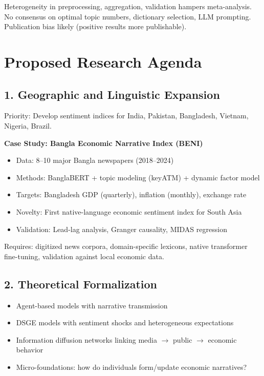 \documentclass[11pt]{article}
\begin{document}
Heterogeneity in preprocessing, aggregation, validation hampers meta-analysis. No consensus on optimal topic numbers, dictionary selection, LLM prompting. Publication bias likely (positive results more publishable).

\section{Proposed Research Agenda}

\subsection{1. Geographic and Linguistic Expansion}

Priority: Develop sentiment indices for India, Pakistan, Bangladesh, Vietnam, Nigeria, Brazil.

\textbf{Case Study: Bangla Economic Narrative Index (BENI)}
\begin{itemize}
\item Data: 8--10 major Bangla newspapers (2018--2024)
\item Methods: BanglaBERT + topic modeling (keyATM) + dynamic factor model
\item Targets: Bangladesh GDP (quarterly), inflation (monthly), exchange rate
\item Novelty: First native-language economic sentiment index for South Asia
\item Validation: Lead-lag analysis, Granger causality, MIDAS regression
\end{itemize}

Requires: digitized news corpora, domain-specific lexicons, native transformer fine-tuning, validation against local economic data.

\subsection{2. Theoretical Formalization}

\begin{itemize}
\item Agent-based models with narrative transmission
\item DSGE models with sentiment shocks and heterogeneous expectations  
\item Information diffusion networks linking media $\to$ public $\to$ economic behavior
\item Micro-foundations: how do individuals form/update economic narratives?
\end{itemize}
\end{document}
